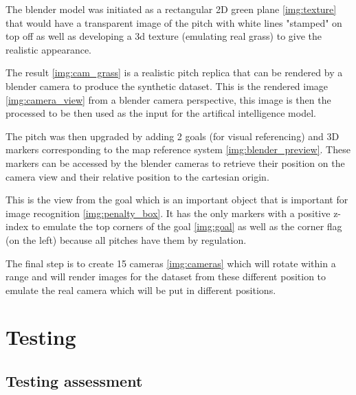 \documentclass[
    11pt,
    twoside
]{report}
\begin{document}
The blender model was initiated as a rectangular 2D green plane \ref{img:texture} that would have a transparent image of the pitch with white lines "stamped" on top off as well as developing a 3d texture (emulating real grass) to give the realistic appearance.



The result \ref{img:cam_grass} is a realistic pitch replica that can be rendered by a blender camera to produce the synthetic dataset. This is the rendered image \ref{img:camera_view} from a blender camera perspective, this image is then the processed to be then used as the input for the artifical intelligence model.



The pitch was then upgraded by adding 2 goals (for visual referencing) and 3D markers corresponding to the map reference system \ref{img:blender_preview}. These markers can be accessed by the blender cameras to retrieve their position on the camera view and their relative position to the cartesian origin.



This is the view from the goal which is an important object that is important for image recognition \ref{img:penalty_box}. It has the only markers with a positive z-index to emulate the top corners of the goal \ref{img:goal} as well as the corner flag (on the left) because all pitches have them by regulation.



The final step is to create 15 cameras \ref{img:cameras} which will rotate within a range and will render images for the dataset from these different position to emulate the real camera which will be put in different positions.





\chapter{Testing}



\section{Testing assessment}
\end{document}
